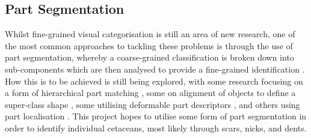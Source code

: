 \subsection{Part Segmentation}\label{ch:Background,sec:Fine-grainedCV,sub:PartSegmentation}
Whilst fine-grained visual categorisation is still an area of new research, one of the most common approaches to tackling these problems is through the use of part segmentation, whereby a coarse-grained classification is broken down into sub-components which are then analysed to provide a fine-grained identification \cite{zhang_part-based_2014}. How this is to be achieved is still being explored, with some research focusing on a form of hierarchical part matching \cite{xie_hierarchical_2013}, some on alignment of objects to define a super-class shape \cite{gavves_fine-grained_2013}, some utilising deformable part descriptors \cite{zhang_deformable_2013}, and others using part localisation \cite{liu_dog_2012}. This project hopes to utilise some form of part segmentation in order to identify individual cetaceans, most likely through scars, nicks, and dents. 


